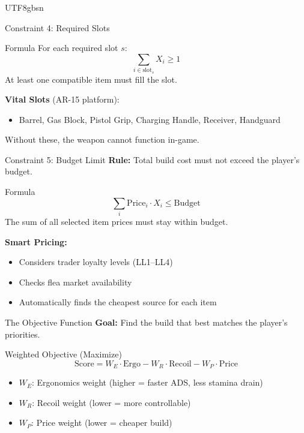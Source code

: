 \documentclass[aspectratio=169]{beamer}
\begin{document}
\begin{CJK*}{UTF8}{gbsn}
\begin{frame}{Constraint 4: Required Slots}
    \vspace{0.3cm}
    \begin{block}{Formula}
        For each required slot $s$:
        \[
        \sum_{i \in \text{slot}_s} X_i \ge 1
        \]
        At least one compatible item must fill the slot.
    \end{block}

    \vspace{0.3cm}
    \textbf{Vital Slots} (AR-15 platform):
    \begin{itemize}
        \item Barrel, Gas Block, Pistol Grip, Charging Handle, Receiver, Handguard
    \end{itemize}

    \vspace{0.2cm}
    Without these, the weapon cannot function in-game.
\end{frame}

\begin{frame}{Constraint 5: Budget Limit}
    \textbf{Rule:} Total build cost must not exceed the player's budget.

    \vspace{0.3cm}
    \begin{block}{Formula}
        \[
        \sum_{i} \text{Price}_i \cdot X_i \le \text{Budget}
        \]
        The sum of all selected item prices must stay within budget.
    \end{block}

    \vspace{0.3cm}
    \textbf{Smart Pricing:}
    \begin{itemize}
        \item Considers trader loyalty levels (LL1--LL4)
        \item Checks flea market availability
        \item Automatically finds the cheapest source for each item
    \end{itemize}
\end{frame}

\begin{frame}{The Objective Function}
    \textbf{Goal:} Find the build that best matches the player's priorities.

    \vspace{0.3cm}
    \begin{block}{Weighted Objective (Maximize)}
        \[
        \text{Score} = W_E \cdot \text{Ergo} - W_R \cdot \text{Recoil} - W_P \cdot \text{Price}
        \]
        \begin{itemize}
            \item $W_E$: Ergonomics weight (higher = faster ADS, less stamina drain)
            \item $W_R$: Recoil weight (lower = more controllable)
            \item $W_P$: Price weight (lower = cheaper build)
        \end{itemize}
    \end{block}


\end{frame}
\end{CJK*}
\end{document}
